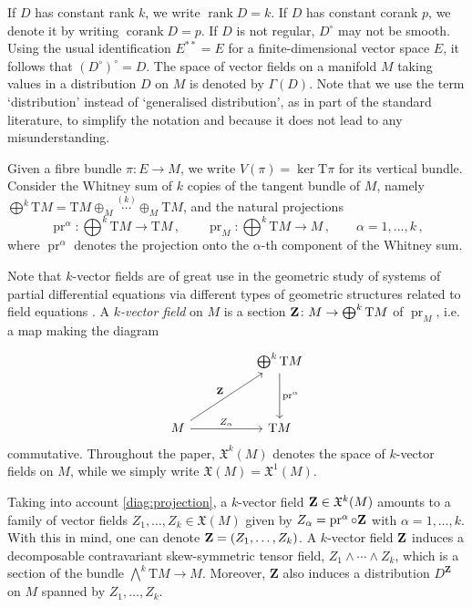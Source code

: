 \documentclass[11pt,twoside]{article}
\theoremstyle{plain}
\theoremstyle{definition}
\theoremstyle{remark}
\newcommand{\T}{\mathrm{T}}
\DeclareMathOperator{\rk}{rank}
\DeclareMathOperator{\cork}{corank}
\DeclareMathOperator{\pr}{pr}
\begin{document}
 

If $D$ has constant rank $k$, we write $\rk D = k$. If $D$ has constant corank $p$, we denote it by writing $\cork D = p$. If $D$ is not regular, $D^\circ$ may not be smooth. Using the usual identification $E^{\ast\ast} = E$ for a finite-dimensional vector space $E$, it follows that $(D^\circ)^\circ = D$.  The space of vector fields on a manifold $M$ taking values in a distribution $D$ on $M$ is denoted by $\Gamma(D)$. Note that we use the term `distribution' instead of `generalised distribution', as in part of the standard literature, to simplify the notation and because it does not lead to any misunderstanding.

Given a fibre bundle $\pi:E\rightarrow M$, we write $V(\pi)=\ker \T\pi$ for its vertical bundle. 
Consider the Whitney sum of $k$ copies of the tangent bundle of $M$, namely $\bigoplus^k\T M = \T M\oplus_M\overset{(k)}{\dotsb}\oplus_M \T M$, and the natural projections
\begin{equation*}
    \textstyle\pr^\alpha\colon\bigoplus^k\T M\to\T M\,, \qquad \pr_M\colon\bigoplus^k\T M\to M\,, \qquad \alpha=1,\dotsc, k\, ,
\end{equation*}
where $\pr^\alpha$ denotes the projection onto the $\alpha$-th component of the Whitney sum.

 Note that $k$-vector fields are of great use in the geometric study of systems of partial differential equations via different types of geometric structures related to field equations \cite{LSV_15,MRSV_15}. A {\it $k$-vector field} on $M$ is a section ${\bf Z}\colon M\to\bigoplus^k\T M$ of $\pr_M$, i.e. a map making the diagram
\begin{equation}
\label{diag:projection}
    \begin{tikzcd}[row sep=huge, column sep=huge]
        & \bigoplus^k\T M \arrow[d, "\pr^\alpha"]\\
        M \arrow[r, "Z_\alpha"] \arrow[ur, "{\bf Z}"] & \T M
    \end{tikzcd}
\end{equation}
commutative. Throughout the paper, $\mathfrak{X}^k(M)$ denotes the space of $k$-vector fields on $M$, while we simply write $\mathfrak{X}(M)=\mathfrak{X}^1(M)$.
 

Taking into account \eqref{diag:projection}, a $k$-vector field ${\bf Z}\in\mathfrak{X}^k(M)$ amounts to a family of vector fields $Z_1,\dotsc,Z_k\in\mathfrak{X}(M)$ given by $Z_\alpha = \pr^\alpha\circ{\bf Z}$ with $\alpha=1,\dotsc,k$. With this in mind, one can denote ${\bf Z} = (Z_1,\dotsc, Z_k)$. A $k$-vector field ${\bf Z}$ induces a decomposable contravariant skew-symmetric tensor field, $Z_1\wedge\dotsb\wedge Z_k$, which is a section of the bundle $\bigwedge^k\T M\to M$. Moreover, $\mathbf{Z}$ also induces a distribution $D^\mathbf{Z}$ on $M$ spanned by $Z_1, \dotsc, Z_k$.
\end{document}
